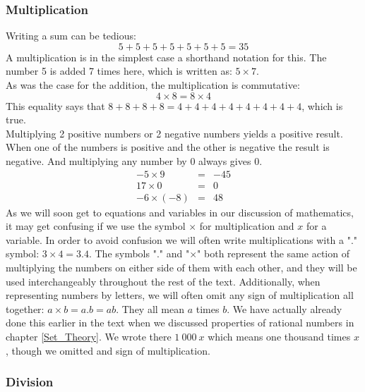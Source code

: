 \subsubsection{Multiplication}

\noindent Writing a sum can be tedious:
\begin{equation*}
5 + 5 + 5 + 5 + 5 + 5 + 5 = 35
\end{equation*}
A multiplication is in the simplest case a shorthand notation for this. The number 5 is added 7 times here, which is written as: $ 5 \times 7 $.\\

\noindent As was the case for the addition, the multiplication is commutative:
\begin{equation*}
4 \times 8 = 8 \times 4
\end{equation*}
This equality says that $8+8+8+8 = 4+4+4+4+4+4+4+4$, which is true.\\

\noindent Multiplying 2 positive numbers or 2 negative numbers yields a positive result. When one of the numbers is positive and the other is negative the result is negative. And multiplying any number by 0 always gives 0.
\begin{eqnarray*}
-5 \times 9 & = & -45 \\
17 \times 0 & = & 0 \\
-6 \times (-8) & = & 48
\end{eqnarray*}
\noindent As we will soon get to equations and variables in our discussion of mathematics, it may get confusing if we use the symbol $\times$ for multiplication and $x$ for a variable. In order to avoid confusion we will often write multiplications with a "." symbol: $3 \times 4 = 3 . 4$. The symbols "$.$" and "$\times$" both represent the same action of multiplying the numbers on either side of them with each other, and they will be used interchangeably throughout the rest of the text. Additionally, when representing numbers by letters, we will often omit any sign of multiplication all together: $a \times b = a . b = ab$. They all mean $a$ times $b$. We have actually already done this earlier in the text when we discussed properties of rational numbers in chapter \ref{Set_Theory}. We wrote there $1\: 000 \: x$ which means one thousand times $x$, though we omitted and sign of multiplication.

\subsubsection{Division}

